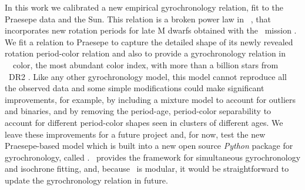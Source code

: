 In this work we calibrated a new empirical gyrochronology relation, fit to the
Praesepe data and the Sun.
This relation is a broken power law in \gaia\ \gcolor, that incorporates new
rotation periods for late M dwarfs obtained with the \ktwo\ mission
\citep{douglas2017, rebull2017}.
We fit a relation to Praesepe to capture the detailed shape of its newly
revealed rotation period-color relation and also to provide a gyrochronology
relation in \gaia\ \gcolor\ color, the most abundant color index, with more
than a billion stars from \gaia\ DR2 \citep{brown2018}.
Like any other gyrochronology model, this model cannot reproduce all the
observed data and some simple modifications could make significant
improvements, for example, by including a mixture model to account for
outliers and binaries, and by removing the period-age, period-color
separability to account for different period-color shapes seen in clusters of
different ages.
We leave these improvements for a future project and, for now, test the
new Praesepe-based model which is built into a new open source {\it Python}
package for gyrochronology, called \sd.
\sd\ provides the framework for simultaneous gyrochronology and isochrone
fitting, and, because \sd\ is modular, it would be straightforward to update
the gyrochronology relation in future.


